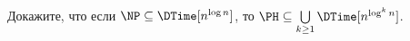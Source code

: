 Докажите, что если $\NP \subseteq \DTime[n^{\log n}]$, то $\PH \subseteq \bigcup\limits_{k \ge 1} \DTime[n^{\log^k n}]$.
